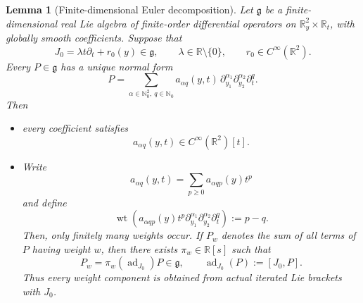 \documentclass[11pt,a4paper]{article}
\numberwithin{equation}{section}
\theoremstyle{journalplain}
\newtheorem{lemma}[theorem]{Lemma}
\theoremstyle{journaldef}
\begin{document}
\begin{lemma}[Finite-dimensional Euler decomposition]
\label{lem:smooth-euler-module}
Let $\mathfrak g$ be a finite-dimensional real Lie algebra of
finite-order differential operators on $\mathbb R^2_y\times\mathbb R_t$,
with globally smooth coefficients. Suppose that
\[
J_0=\lambda t\partial_t+r_0(y)\in\mathfrak g,
\qquad
\lambda\in\mathbb R\setminus\{0\},
\qquad
r_0\in C^\infty(\mathbb R^2).
\]
Every $P\in\mathfrak g$ has a unique normal form
\[
P=
\sum_{\alpha\in\mathbb N_0^2,\ q\in\mathbb N_0}
a_{\alpha q}(y,t)\,
\partial_{y_1}^{\alpha_1}
\partial_{y_2}^{\alpha_2}
\partial_t^q.
\]
Then 
\begin{itemize}
\item every coefficient satisfies
\[
a_{\alpha q}(y,t)\in C^\infty(\mathbb R^2)[t].
\]
\item Write
\[
a_{\alpha q}(y,t)
=
\sum_{p\ge0}a_{\alpha qp}(y)t^p
\]
and define
\[
\operatorname{wt}
\left(
a_{\alpha qp}(y)t^p
\partial_{y_1}^{\alpha_1}
\partial_{y_2}^{\alpha_2}
\partial_t^q
\right)
:=p-q.
\]
Then, only finitely many weights occur. If $P_w$ denotes the sum of all
terms of $P$ having weight $w$, then there exists
$\pi_w\in\mathbb R[s]$ such that
\[
P_w=\pi_w(\operatorname{ad}_{J_0})P\in\mathfrak g,
\qquad
\operatorname{ad}_{J_0}(P):=[J_0,P].
\]
Thus every weight component is obtained from actual iterated
Lie brackets with $J_0$.
\end{itemize}
\end{lemma}
\end{document}
